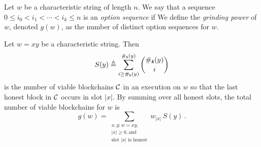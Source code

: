 \begin{definition}\label{def:option-sequence}
  Let $w$ be a characteristic string of length $n$. 
  We say that a sequence
  $
    0 \leq i_0 < i_1 < \cdots < i_k \leq n
  $
  is an \emph{option sequence} if
  We define the \emph{grinding power} of $w$, denoted $g(w)$, 
  as the 
  number of distinct option sequences for $w$.
\end{definition}


Let $w = xy$ be a characteristic string. 
Then
\begin{equation}\label{eq:S_y}
    S(y) 
    \triangleq \sum_{i \geq \#_{\mathtt{h}}(y)}^{\#_{\mathtt{A}}(y)}{ \binom{\#_{\mathtt{A}}(y)}{i} } 
\end{equation}
is the number of viable blockchains $\mathcal{C}$
in an execution on $w$ 
so that the last honest block in $\mathcal{C}$ occurs in slot $|x|$. 
By summing over all honest slots, 
the total number of viable blockchains for $w$ is 
\begin{equation}\label{eq:g_praos}
    g(w) 
    = \sum_{\substack{
        x,y : w = xy, \\ 
        |x| \geq 0, \text{and}\\ 
        \text{slot $|x|$ is honest} }
      } w_{|x|}\, S(y)
    \,.  
\end{equation}




